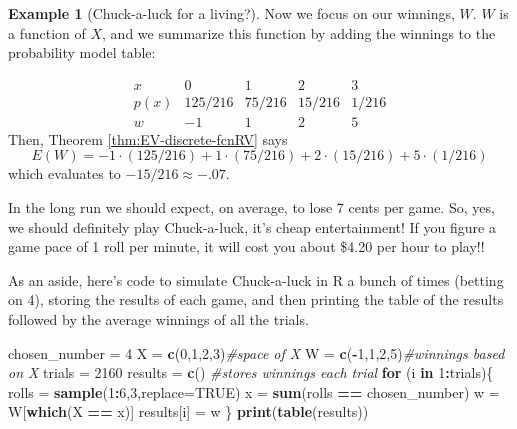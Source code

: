 \documentclass[
]{book}
\newenvironment{Shaded}{\begin{snugshade}}{\end{snugshade}}
\newcommand{\AttributeTok}[1]{\textcolor[rgb]{0.13,0.29,0.53}{#1}}
\newcommand{\CommentTok}[1]{\textcolor[rgb]{0.56,0.35,0.01}{\textit{#1}}}
\newcommand{\ConstantTok}[1]{\textcolor[rgb]{0.56,0.35,0.01}{#1}}
\newcommand{\ControlFlowTok}[1]{\textcolor[rgb]{0.13,0.29,0.53}{\textbf{#1}}}
\newcommand{\DecValTok}[1]{\textcolor[rgb]{0.00,0.00,0.81}{#1}}
\newcommand{\FunctionTok}[1]{\textcolor[rgb]{0.13,0.29,0.53}{\textbf{#1}}}
\newcommand{\NormalTok}[1]{#1}
\newcommand{\OtherTok}[1]{\textcolor[rgb]{0.56,0.35,0.01}{#1}}
\newcommand{\SpecialCharTok}[1]{\textcolor[rgb]{0.81,0.36,0.00}{\textbf{#1}}}
\theoremstyle{definition}
\theoremstyle{definition}
\newtheorem{example}{Example}[chapter]
\theoremstyle{definition}
\theoremstyle{definition}
\theoremstyle{remark}
\begin{document}
\begin{example}[Chuck-a-luck for a living?]
\protect\hypertarget{exm:Chuckaluck-winnings}{}\label{exm:Chuckaluck-winnings}Now we focus on our winnings, \(W\). \(W\) is a function of \(X\), and we summarize this function by adding the winnings to the probability model table:

\[
\begin{array}{c|c|c|c|c}
x & 0 & 1 & 2 & 3 \\ \hline
p(x) & 125/216 & 75/216 & 15/216 & 1/216 \\ \hline
w & -1 & 1 & 2 & 5
\end{array}
\]
Then, Theorem \ref{thm:EV-discrete-fcnRV} says \[E(W) = -1\cdot(125/216) + 1 \cdot (75/216) + 2 \cdot (15/216) + 5\cdot (1/216)\] which evaluates to \(-15/216 \approx -.07\).

In the long run we should expect, on average, to lose 7 cents per game. So, yes, we should definitely play Chuck-a-luck, it's cheap entertainment! If you figure a game pace of 1 roll per minute, it will cost you about \$4.20 per hour to play!!
\end{example}

As an aside, here's code to simulate Chuck-a-luck in R a bunch of times (betting on 4), storing the results of each game, and then printing the table of the results followed by the average winnings of all the trials.

\begin{Shaded}
\begin{Highlighting}[]
\NormalTok{chosen\_number }\OtherTok{=} \DecValTok{4}
\NormalTok{X }\OtherTok{=} \FunctionTok{c}\NormalTok{(}\DecValTok{0}\NormalTok{,}\DecValTok{1}\NormalTok{,}\DecValTok{2}\NormalTok{,}\DecValTok{3}\NormalTok{)}\CommentTok{\#space of X}
\NormalTok{W }\OtherTok{=} \FunctionTok{c}\NormalTok{(}\SpecialCharTok{{-}}\DecValTok{1}\NormalTok{,}\DecValTok{1}\NormalTok{,}\DecValTok{2}\NormalTok{,}\DecValTok{5}\NormalTok{)}\CommentTok{\#winnings based on X}
\NormalTok{trials }\OtherTok{=} \DecValTok{2160}
\NormalTok{results }\OtherTok{=} \FunctionTok{c}\NormalTok{() }\CommentTok{\#stores winnings each trial }
\ControlFlowTok{for}\NormalTok{ (i }\ControlFlowTok{in} \DecValTok{1}\SpecialCharTok{:}\NormalTok{trials)\{}
\NormalTok{  rolls }\OtherTok{=} \FunctionTok{sample}\NormalTok{(}\DecValTok{1}\SpecialCharTok{:}\DecValTok{6}\NormalTok{,}\DecValTok{3}\NormalTok{,}\AttributeTok{replace=}\ConstantTok{TRUE}\NormalTok{)}
\NormalTok{  x }\OtherTok{=} \FunctionTok{sum}\NormalTok{(rolls }\SpecialCharTok{==}\NormalTok{ chosen\_number)}
\NormalTok{  w }\OtherTok{=}\NormalTok{ W[}\FunctionTok{which}\NormalTok{(X }\SpecialCharTok{==}\NormalTok{ x)]}
\NormalTok{  results[i] }\OtherTok{=}\NormalTok{ w}
\NormalTok{\}}
\FunctionTok{print}\NormalTok{(}\FunctionTok{table}\NormalTok{(results))}
\end{Highlighting}
\end{Shaded}
\end{document}
